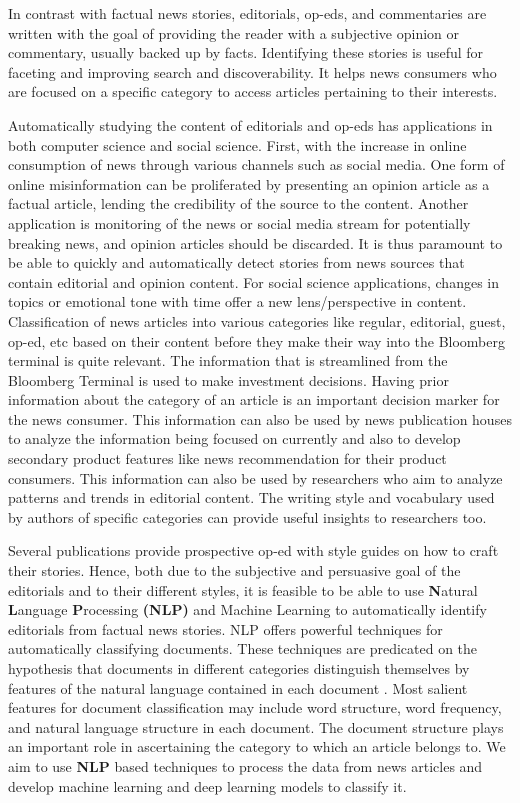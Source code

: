 \documentclass[11pt]{article}
\begin{document}
In contrast with factual news stories, editorials, op-eds, and commentaries are written with the goal of providing the reader with a subjective opinion or commentary, usually backed up by facts. Identifying these stories is useful for faceting and improving search and discoverability. It helps news consumers who are focused on a specific category to access articles pertaining to their interests.

Automatically studying the content of editorials and op-eds has applications in both computer science and social science. First, with the increase in online consumption of news through various channels such as social media. One form of online misinformation can be proliferated by presenting an opinion article as a factual article, lending the credibility of the source to the content. Another application is monitoring of the news or social media stream for potentially breaking news, and opinion articles should be discarded. It is thus paramount to be able to quickly and automatically detect stories from news sources that contain editorial and opinion content. For social science applications, changes in topics or emotional tone with time offer a new lens/perspective in content. Classification of news articles into various categories like regular, editorial, guest, op-ed, etc based on their content before they make their way into the Bloomberg terminal is quite relevant. The information that is streamlined from the Bloomberg Terminal is used to make investment decisions. Having prior information about the category of an article is an important decision marker for the news consumer. This information can also be used by news publication houses to analyze the information being focused on currently and also to develop secondary product features like news recommendation for their product consumers. This information can also be used by researchers who aim to analyze patterns and trends in editorial content. The writing style and vocabulary used by authors of specific categories can provide useful insights to researchers too. 

Several publications provide prospective op-ed with style guides on how to craft their stories. Hence, both due to the subjective and persuasive goal of the editorials and to their different styles, it is feasible to be able to use \textbf{N}atural \textbf{L}anguage \textbf{P}rocessing \textbf{(NLP)} and Machine Learning to automatically identify editorials from factual news stories. NLP offers powerful techniques for automatically classifying documents. These techniques are predicated on the hypothesis that documents in different categories distinguish themselves by features of the natural language contained in each document \cite{ramdass2009document}. Most salient features for document classification may include word structure, word frequency, and natural language structure in each document. The document structure plays an important role in ascertaining the category to which an article belongs to. We aim to use \textbf{NLP} based techniques to process the data from news articles and develop machine learning and deep learning models to classify it. 
\end{document}
